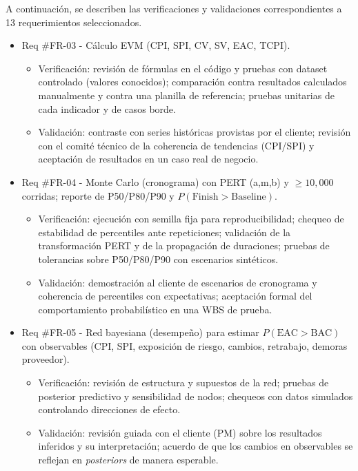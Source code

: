 \documentclass[12pt]
{charter}
\begin{document}
A continuación, se describen las verificaciones y validaciones correspondientes a 13 requerimientos seleccionados.

\begin{itemize}

\item Req \#FR-03 - Cálculo EVM (CPI, SPI, CV, SV, EAC, TCPI).
  \begin{itemize}
    \item Verificación: revisión de fórmulas en el código y pruebas con dataset controlado (valores conocidos); comparación contra resultados calculados manualmente y contra una planilla de referencia; pruebas unitarias de cada indicador y de casos borde.
    \item Validación: contraste con series históricas provistas por el cliente; revisión con el comité técnico de la coherencia de tendencias (CPI/SPI) y aceptación de resultados en un caso real de negocio.
  \end{itemize}

\item Req \#FR-04 - Monte Carlo (cronograma) con PERT (a,m,b) y $\geq 10{,}000$ corridas; reporte de P50/P80/P90 y $P(\text{Finish}>\text{Baseline})$.
  \begin{itemize}
    \item Verificación: ejecución con semilla fija para reproducibilidad; chequeo de estabilidad de percentiles ante repeticiones; validación de la transformación PERT y de la propagación de duraciones; pruebas de tolerancias sobre P50/P80/P90 con escenarios sintéticos.
    \item Validación: demostración al cliente de escenarios de cronograma y coherencia de percentiles con expectativas; aceptación formal del comportamiento probabilístico en una WBS de prueba.
  \end{itemize}

\item Req \#FR-05 - Red bayesiana (desempeño) para estimar $P(\text{EAC}>\text{BAC})$ con observables (CPI, SPI, exposición de riesgo, cambios, retrabajo, demoras proveedor).
  \begin{itemize}
    \item Verificación: revisión de estructura y supuestos de la red; pruebas de posterior predictivo y sensibilidad de nodos; chequeos con datos simulados controlando direcciones de efecto.
    \item Validación: revisión guiada con el cliente (PM) sobre los resultados inferidos y su interpretación; acuerdo de que los cambios en observables se reflejan en \textit{posteriors} de manera esperable.
  \end{itemize}


\end{itemize}
\end{document}
